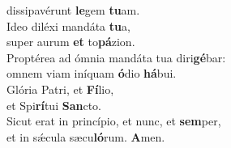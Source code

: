 \evenverse dissipavérunt \textbf{le}gem \textbf{tu}am.\\
\oddverse Ideo diléxi mandáta \textbf{tu}a,~\*\\
\oddverse super aurum \textbf{et} to\textbf{pá}zion.\\
\evenverse Proptérea ad ómnia mandáta tua diri\textbf{gé}bar:~\*\\
\evenverse omnem viam iníquam \textbf{ó}dio \textbf{há}bui.\\
\oddverse Glória Patri, et \textbf{Fí}lio,~\*\\
\oddverse et Spi\textbf{rí}tui \textbf{San}cto.\\
\evenverse Sicut erat in princípio, et nunc, et \textbf{sem}per,~\*\\
\evenverse et in sǽcula sæcu\textbf{ló}rum. \textbf{A}men.\\
